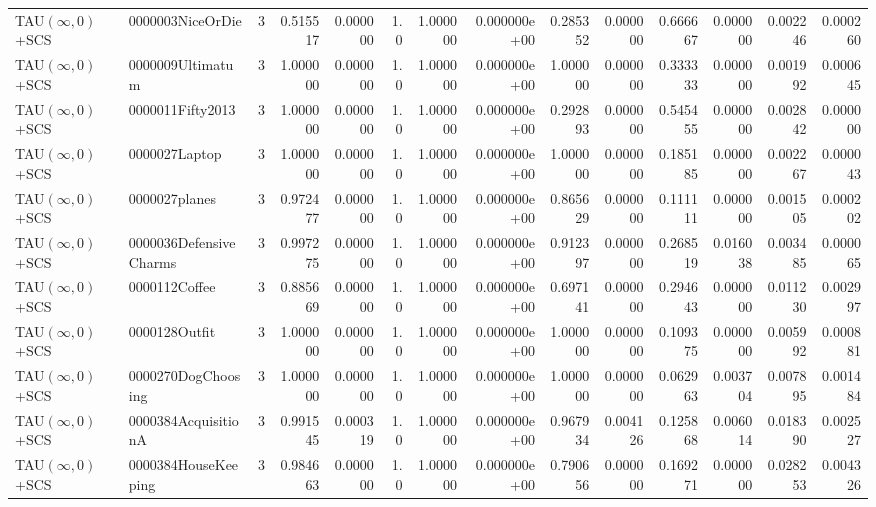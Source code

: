 \begin{tabular}{llrr|r|rr|rr|rr|rrr}
     TAU$(\infty, 0)$+SCS &       0000003NiceOrDie &       3 & 0.515517 & 0.000000 &  1.0 &      1.000000 & 0.000000e+00 &      0.285352 & 0.000000 &      0.666667 &    0.000000 &     0.002246 &    0.000260 \\
     TAU$(\infty, 0)$+SCS &       0000009Ultimatum &       3 & 1.000000 & 0.000000 &  1.0 &      1.000000 & 0.000000e+00 &      1.000000 & 0.000000 &      0.333333 &    0.000000 &     0.001992 &    0.000645 \\
     TAU$(\infty, 0)$+SCS &       0000011Fifty2013 &       3 & 1.000000 & 0.000000 &  1.0 &      1.000000 & 0.000000e+00 &      0.292893 & 0.000000 &      0.545455 &    0.000000 &     0.002842 &    0.000000 \\
     TAU$(\infty, 0)$+SCS &          0000027Laptop &       3 & 1.000000 & 0.000000 &  1.0 &      1.000000 & 0.000000e+00 &      1.000000 & 0.000000 &      0.185185 &    0.000000 &     0.002267 &    0.000043 \\
     TAU$(\infty, 0)$+SCS &          0000027planes &       3 & 0.972477 & 0.000000 &  1.0 &      1.000000 & 0.000000e+00 &      0.865629 & 0.000000 &      0.111111 &    0.000000 &     0.001505 &    0.000202 \\
     TAU$(\infty, 0)$+SCS & 0000036DefensiveCharms &       3 & 0.997275 & 0.000000 &  1.0 &      1.000000 & 0.000000e+00 &      0.912397 & 0.000000 &      0.268519 &    0.016038 &     0.003485 &    0.000065 \\
     TAU$(\infty, 0)$+SCS &          0000112Coffee &       3 & 0.885669 & 0.000000 &  1.0 &      1.000000 & 0.000000e+00 &      0.697141 & 0.000000 &      0.294643 &    0.000000 &     0.011230 &    0.002997 \\
     TAU$(\infty, 0)$+SCS &          0000128Outfit &       3 & 1.000000 & 0.000000 &  1.0 &      1.000000 & 0.000000e+00 &      1.000000 & 0.000000 &      0.109375 &    0.000000 &     0.005992 &    0.000881 \\
     TAU$(\infty, 0)$+SCS &     0000270DogChoosing &       3 & 1.000000 & 0.000000 &  1.0 &      1.000000 & 0.000000e+00 &      1.000000 & 0.000000 &      0.062963 &    0.003704 &     0.007895 &    0.001484 \\
     TAU$(\infty, 0)$+SCS &    0000384AcquisitionA &       3 & 0.991545 & 0.000319 &  1.0 &      1.000000 & 0.000000e+00 &      0.967934 & 0.004126 &      0.125868 &    0.006014 &     0.018390 &    0.002527 \\
     TAU$(\infty, 0)$+SCS &    0000384HouseKeeping &       3 & 0.984663 & 0.000000 &  1.0 &      1.000000 & 0.000000e+00 &      0.790656 & 0.000000 &      0.169271 &    0.000000 &     0.028253 &    0.004326 \\

\end{tabular}
